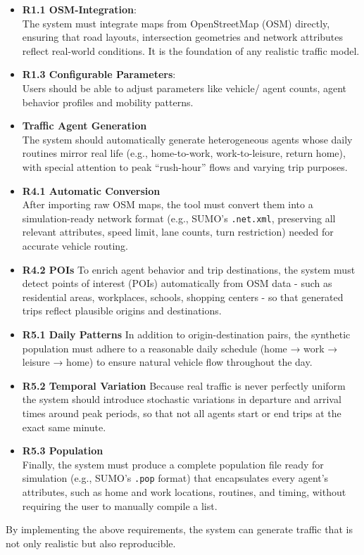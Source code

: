 \begin{itemize}
    \item \textbf{R1.1 OSM-Integration}:\\    
    The system must integrate maps from OpenStreetMap (OSM) directly, ensuring that road layouts, intersection geometries and network attributes reflect real-world conditions. It is the foundation of any realistic traffic model.
    \item \textbf{R1.3 Configurable Parameters}:\\
    Users should be able to adjust parameters like vehicle/ agent counts, agent behavior profiles and mobility patterns.
    \item \textbf{Traffic Agent Generation}\\
    The system should automatically generate heterogeneous agents whose daily routines mirror real life (e.g., home-to-work, work-to-leisure, return home), with special attention to peak “rush-hour” flows and varying trip purposes.
    \item \textbf{R4.1 Automatic Conversion}\\
    After importing raw OSM maps, the tool must convert them into a simulation-ready network format (e.g., SUMO’s \texttt{.net.xml}, preserving all relevant attributes, speed limit, lane counts, turn restriction) needed for accurate vehicle routing.
    \item \textbf{R4.2 POIs}
    To enrich agent behavior and trip destinations, the system must detect points of interest (POIs) automatically from OSM data - such as residential areas, workplaces, schools, shopping centers - so that generated trips reflect plausible origins and destinations.
    \item \textbf{R5.1 Daily Patterns}
    In addition to origin-destination pairs, the synthetic population must adhere to a reasonable daily schedule (home → work → leisure → home) to ensure natural vehicle flow throughout the day.
    \item \textbf{R5.2 Temporal Variation}
    Because real traffic is never perfectly uniform the system should introduce stochastic variations in departure and arrival times around peak periods, so that not all agents start or end trips at the exact same minute.
    \item \textbf{R5.3 Population}\\
    Finally, the system must produce a complete population file ready for simulation (e.g., SUMO’s \texttt{.pop} format) that encapsulates every agent’s attributes, such as home and work locations, routines, and timing, without requiring the user to manually compile a list.
\end{itemize}
By implementing the above requirements, the system can generate traffic that is not only realistic but also reproducible.

